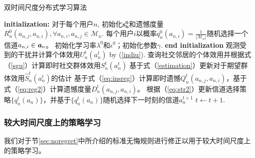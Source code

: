 \begin{algorithm}
\caption{双时间尺度分布式学习算法}
\label{alg:RCS}
\begin{algorithmic}[1]
\STATE \textbf{initialization:} 对于每个用户$n$,
\STATE 初始化$\mathbf{s^0_n}$和遗憾度量$R_n^0(a_{n,j},a_{n,i}), \forall a_{n,i}, a_{n,j}\in\mathcal{M}_n$.
\STATE 每个用户$i$以概率$q^0_n(a_{n,i})=\frac{1}{|\mathcal{M}_n|}$随机选择一个信道$a_{n,i}\in\emph{\textbf{a}}_n$。
\STATE 初始化学习率$\lambda^0$和$\epsilon^0$；初始化参数$\gamma$.
\STATE \textbf{end initialization}
\STATE 观测受到的干扰并计算个体效用$U_n^t(a^t_n)$ by (\ref{indiu}).
\STATE 查询社交邻居的个体效用并根据式（\ref{sgu}）计算即时社交群体效用$S_{n}^t(a^t_n)$
\STATE 基于式（\ref{estimation}）更新对于期望群体效用$\hat{S}_{n}^t(a^t_n)$的估计
\STATE 基于式（\ref{eq:insreg}）计算即时遗憾$Q^t_n(a_{n,j},a_{n,i})$，基于式（\ref{eq:reg2}）计算遗憾度量$D^t_n(a_{n,j},a_{n,i})$。
\STATE 根据（\ref{eq:str2}）更新信道选择策略$\{q^t_n(a_n)\}$，并基于$\{q^t_n(a_n)\}$随机选择下一时刻的信道$a^{t+1}_n$
\STATE $t\leftarrow t+1$.
\ENDFOR
\end{algorithmic}
\end{algorithm}

\subsubsection{较大时间尺度上的策略学习}\label{sec:single}
我们对于节\ref{sec:noregret}中所介绍的标准无悔规则进行修正以用于较大时间尺度上的策略学习。

